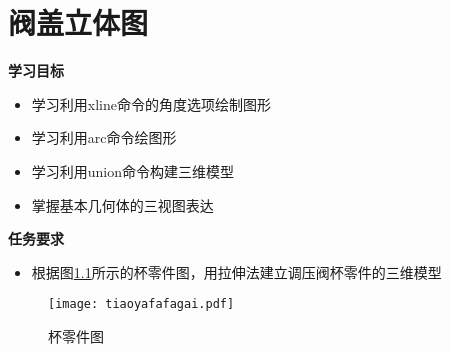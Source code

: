\chapter{阀盖立体图}

{\bfseries 学习目标}
\begin{itemize}
\item 学习利用xline命令的角度选项绘制图形
\item 学习利用arc命令绘图形
\item 学习利用union命令构建三维模型
\item 掌握基本几何体的三视图表达
\end{itemize}

{\bfseries 任务要求}
\begin{itemize}
\item 根据图\ref{fig:tiaoyafafagai}所示的杯零件图，用拉伸法建立调压阀杯零件的三维模型
\end{itemize}

\noindent
\begin{figure}[htbp]
\centering
\texttt{[image: tiaoyafafagai.pdf]}
\caption{杯零件图}\label{fig:tiaoyafafagai}
\end{figure}
\endinput